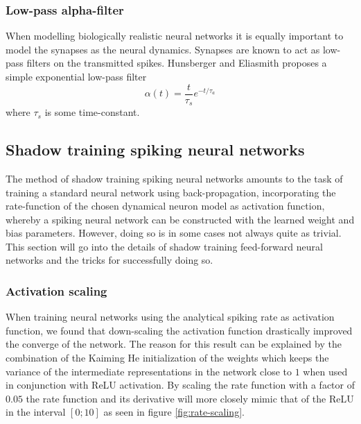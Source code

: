 \documentclass[a4paper,11pt]{article}
\begin{document}
\subsubsection{Low-pass alpha-filter}
When modelling biologically realistic neural networks it is equally important to model the synapses as the neural dynamics. Synapses are known to act as low-pass filters on the transmitted spikes. Hunsberger and Eliasmith \cite{hunsberger2015spiking} proposes a simple exponential low-pass filter
\begin{equation} \label{eq:alpha-filter}
  \alpha(t) = \frac{t}{\tau_{s}} e^{-t / \tau_{a}}
\end{equation}
where $\tau_s$ is some time-constant. 



\subsection{Shadow training spiking neural networks}
The method of shadow training spiking neural networks amounts to the task of training a standard neural network using back-propagation, incorporating the rate-function of the chosen dynamical neuron model as activation function, whereby a spiking neural network can be constructed with the learned weight and bias parameters. However, doing so is in some cases not always quite as trivial. This section will go into the details of shadow training feed-forward neural networks and the tricks for successfully doing so. 

\subsubsection{Activation scaling} \label{sec:activation-scaling}
When training neural networks using the analytical spiking rate as activation function, we found that down-scaling the activation function drastically improved the converge of the network. The reason for this result can be explained by the combination of the Kaiming He initialization of the weights which keeps the variance of the intermediate representations in the network close to $1$ when used in conjunction with ReLU activation. By scaling the rate function with a factor of $0.05$ the rate function and its derivative will more closely mimic that of the ReLU in the interval $[0; 10]$ as seen in figure \ref{fig:rate-scaling}. 
\end{document}
